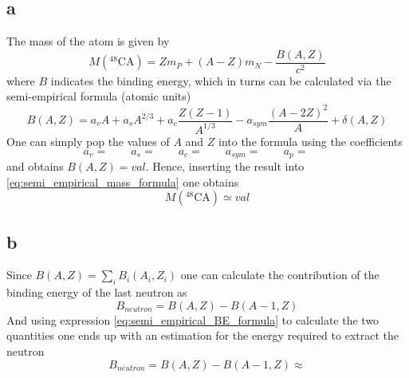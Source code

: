 \subsection*{a}
The mass of the atom is given by
\begin{equation*}
    M(^{48}\text{CA}) = Zm_P + (A-Z)m_N - \frac{B(A, Z)}{c^2}
    \label{eq:semi_empirical_mass_formula}
\end{equation*}
where $B$ indicates the binding energy, which in turns can be calculated via the semi-empirical formula (atomic units)
\begin{equation}
    B(A, Z)= a_v A + a_s A^{2/3} + a_c \frac{Z(Z-1)}{A^{1/3}} - a_{sym} \frac{(A - 2Z)^2}{A} + \delta (A, Z)
    \label{eq:semi_empirical_BE_formula}
\end{equation}
One can simply pop the values of $A$ and $Z$ into the formula using the coefficients
\begin{equation*}
    a_v = \qquad a_s = \qquad a_c = \qquad a_{sym} = \qquad a_p = \qquad
\end{equation*}
and obtains $B(A, Z) = val$. Hence, inserting the result into \ref{eq:semi_empirical_mass_formula} one obtains
\begin{equation*}
    M(^{48}\text{CA}) \simeq val
\end{equation*}

\subsection*{b}
Since $B(A, Z) = \sum_i B_i(A_i, Z_i)$ one can calculate the contribution of the binding energy of the last neutron as 
\begin{equation*}
    B_{neutron} = B(A, Z) - B(A-1, Z)
\end{equation*}
And using expression \ref{eq:semi_empirical_BE_formula} to calculate the two quantities one ends up with an estimation for the energy required to extract the neutron
\begin{equation*}
    B_{neutron} = B(A, Z) - B(A-1, Z) \approx 
\end{equation*}